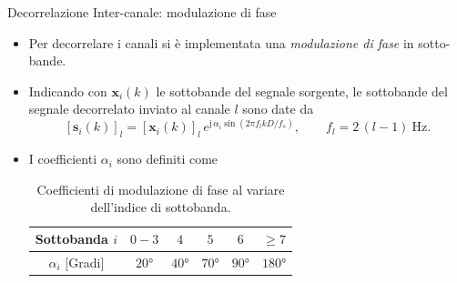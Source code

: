 \documentclass[aspectratio=169,xcolor=dvipsnames]{beamer}
\begin{document}
\begin{frame}{Decorrelazione Inter-canale: modulazione di fase}
    \begin{itemize}
        \item Per decorrelare i canali si è implementata una \emph{modulazione di fase} in sotto-bande.
        \item Indicando con $\mathbf{x}_i (k)$ le sottobande del segnale sorgente, le sottobande del segnale decorrelato inviato al canale $l$ sono date da
            \begin{equation}
		\left[\mathbf{s}_i(k)\right]_l = \left[\mathbf{x}_i(k)\right]_l\, e^{\mathrm{j}\,\alpha_i \sin\left(2\pi f_l k D / f_s\right)},
		\qquad f_l = 2\,(l-1)\ \si{\hertz}.
		\label{eq:phase_mod}
	        \end{equation}
        \item I coefficienti $\alpha_i$ sono definiti come
            \vspace{0.3cm}
            \begin{table}
                \begin{tabular}{|c | c | c | c | c | c|}
                    
                    \hline
                    Sottobanda $i$ & $0-3$ & $4$ & $5$ & $6$ & $\geq 7$ \\
                    \hline
                    $\alpha_i$ $[$Gradi$]$ & $20\si{\degree}$ & $40\si{\degree}$ & $70\si{\degree}$ & $90\si{\degree}$ & $180\si{\degree}$\\
                    \hline
                \end{tabular}
                \caption{Coefficienti di modulazione di fase al variare dell'indice di sottobanda.}
            \end{table}
    \end{itemize}
\end{frame}
\end{document}
